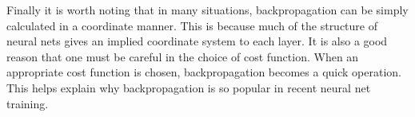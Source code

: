 Finally it is worth noting that in many situations, backpropagation can be simply calculated in a coordinate manner.  This is because much of the structure of neural nets gives an implied coordinate system to each layer.  It is also a good reason that one must be careful in the choice of cost function. When an appropriate cost function is chosen, backpropagation becomes a quick operation. This helps explain why backpropagation is so popular in recent neural net training.